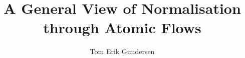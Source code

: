 \documentclass[a4paper,11pt]{article}
\author{Tom Erik Gundersen}
\title{A General View of Normalisation through Atomic Flows}
\begin{document}


\maketitle











\small

\end{document}

